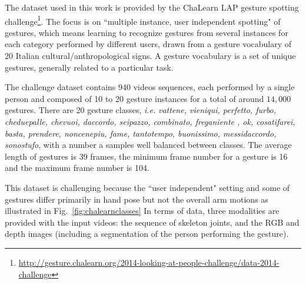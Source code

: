
The dataset used in this work is provided by the ChaLearn LAP \cite{chalearnLAP} gesture spotting challenge\footnote{\href{http://gesture.chalearn.org/2014-looking-at-people-challenge/data-2014-challenge}{http://gesture.chalearn.org/2014-looking-at-people-challenge/data-2014-challenge}}.
%
The focus  is on ``multiple instance, user independent spotting" of gestures, which means learning to recognize gestures from several instances for each category performed by different users, drawn from a gesture vocabulary of 20 Italian cultural/anthropological signs.
A gesture vocabulary is a set of unique gestures, generally related to a particular task.

The challenge dataset contains 940 videos sequences, each performed by a single person and composed of 10 to 20 gesture instances for a total of around $14,000$ gestures.
%
There are 20 gesture classes, \emph{i.e.} \emph{vattene, vieniqui, perfetto, furbo, cheduepalle, chevuoi, daccordo, seipazzo, combinato, freganiente
    , ok, cosatifarei, basta, prendere, noncenepiu, fame, tantotempo, buonissimo, messidaccordo, sonostufo}, with a number a samples well balanced between classes.
The average length of gestures is 39 frames, the minimum frame number for a gesture is 16  and the maximum frame number is 104.

This dataset is challenging because the ``user independent" setting and some of gestures differ primarily in hand pose but not the overall arm motions as illustrated in Fig.~\ref{fig:chalearnclasses}
In terms of data, three modalities are provided with the input videos: the sequence of skeleton joints, and the RGB and depth images
(including a segmentation of the person performing the gesture).

